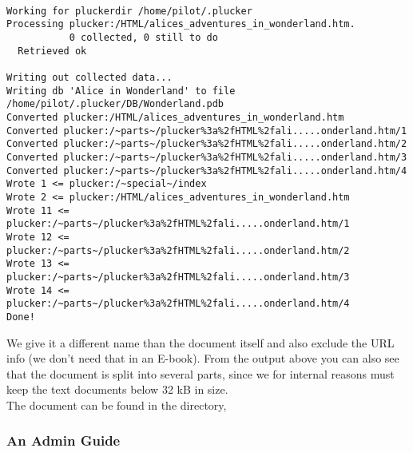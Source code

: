 \begin{latexonly}
\\
\end{latexonly}
\begin{htmlonly}
\\
\end{htmlonly}\\
\begin{verbatim}
Working for pluckerdir /home/pilot/.plucker
Processing plucker:/HTML/alices_adventures_in_wonderland.htm.
           0 collected, 0 still to do
  Retrieved ok

Writing out collected data...
Writing db 'Alice in Wonderland' to file /home/pilot/.plucker/DB/Wonderland.pdb
Converted plucker:/HTML/alices_adventures_in_wonderland.htm
Converted plucker:/~parts~/plucker%3a%2fHTML%2fali.....onderland.htm/1
Converted plucker:/~parts~/plucker%3a%2fHTML%2fali.....onderland.htm/2
Converted plucker:/~parts~/plucker%3a%2fHTML%2fali.....onderland.htm/3
Converted plucker:/~parts~/plucker%3a%2fHTML%2fali.....onderland.htm/4
Wrote 1 <= plucker:/~special~/index
Wrote 2 <= plucker:/HTML/alices_adventures_in_wonderland.htm
Wrote 11 <= plucker:/~parts~/plucker%3a%2fHTML%2fali.....onderland.htm/1
Wrote 12 <= plucker:/~parts~/plucker%3a%2fHTML%2fali.....onderland.htm/2
Wrote 13 <= plucker:/~parts~/plucker%3a%2fHTML%2fali.....onderland.htm/3
Wrote 14 <= plucker:/~parts~/plucker%3a%2fHTML%2fali.....onderland.htm/4
Done!

\end{verbatim}

We give it a different name than the document itself and also exclude
the URL info (we don't need that in an E-book). From the output above
you can also see that the document is split into several parts, since
we for internal reasons must keep the text documents below 32 kB in size.\\

The document can be found in the  directory,

\subsubsection{An Admin Guide}

